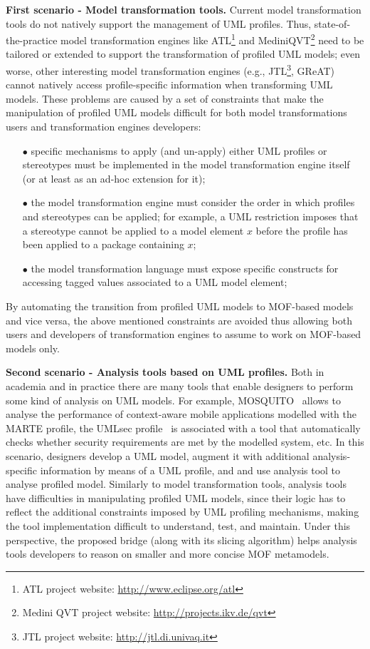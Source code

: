 \textbf{First scenario - Model transformation tools.}
Current model transformation tools do not natively support the management of UML profiles.
Thus, state-of-the-practice model transformation engines
like ATL\footnote{ATL project website: \small{\url{http://www.eclipse.org/atl}}} and
MediniQVT\footnote{Medini QVT project website: \small{\url{http://projects.ikv.de/qvt}}}
need to be tailored or extended to support the transformation of profiled UML models;
even worse, other interesting model transformation engines (e.g.,
JTL\footnote{JTL project website: \small{\url{http://jtl.di.univaq.it}}}, GReAT)
cannot natively access profile-specific information when transforming UML models.
These problems are caused by a set of constraints that make the manipulation of profiled UML models difficult for both model transformations users and transformation engines developers:
%
\vspace{-.15cm}
\begin{itemize}
	\item[$\bullet$] specific mechanisms to apply (and un-apply) either UML profiles or stereotypes must be implemented
	in the model transformation engine itself (or at least as an ad-hoc extension for it);
	\item[$\bullet$] the model transformation engine must consider the order in which profiles and stereotypes can be applied;
	for example, a UML restriction imposes that a stereotype cannot be applied to a model element $x$ before
	the profile has been applied to a package containing $x$;
	\item[$\bullet$] the model transformation language must expose specific constructs for accessing tagged values associated to a UML model element;
\end{itemize}
%
\vspace{-.15cm}
By automating the transition from profiled UML models to MOF-based models and vice versa, the above mentioned constraints
are avoided thus allowing both users and developers of transformation engines to assume to work on MOF-based models only.

\textbf{Second scenario - Analysis tools based on UML profiles.}
Both in academia and in practice there are many tools that enable designers to perform some kind of analysis on UML models.
For example, MOSQUITO~\cite{perfMarte} allows to analyse the performance of context-aware mobile
applications modelled with the MARTE profile,
the UMLsec profile~\cite{securityUMLsec} is associated with a tool that automatically checks whether security
requirements are met by the modelled system, etc.
In this scenario, designers develop a UML model, augment it with additional analysis-specific information by means of a UML profile, and and use analysis tool to analyse profiled model.
Similarly to model transformation tools, analysis tools have difficulties in manipulating profiled UML models, since
their logic has to reflect the additional constraints imposed by UML profiling mechanisms, making the tool
implementation difficult to understand, test, and maintain.
Under this perspective, the proposed bridge (along with its slicing algorithm)
helps analysis tools developers to reason on smaller and more concise MOF metamodels.

